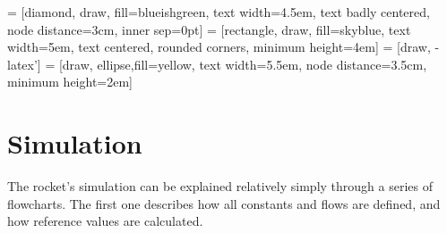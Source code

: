  = [diamond, draw, fill=blueishgreen,
    text width=4.5em, text badly centered, node distance=3cm, inner sep=0pt]
 = [rectangle, draw, fill=skyblue,
    text width=5em, text centered, rounded corners, minimum height=4em]
 = [draw, -latex']
 = [draw, ellipse,fill=yellow, text width=5.5em, node distance=3.5cm,
    minimum height=2em]



\chapter{Simulation}

The rocket's simulation can be explained relatively simply through a series of flowcharts. The first one describes how all constants and flows are defined, and how reference values are calculated.


